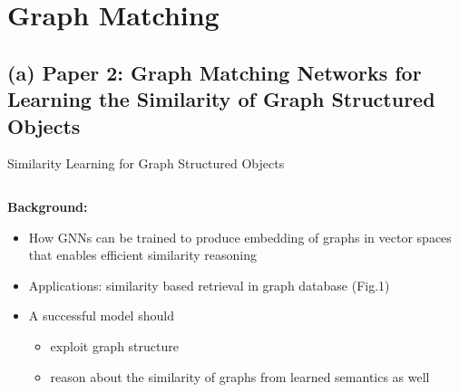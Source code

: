 \documentclass{beamer}
\begin{document}
\section{Graph Matching}


\subsection{(a) Paper 2: Graph Matching Networks for Learning the Similarity of Graph Structured Objects \cite{DBLP:conf/icml/LiGDVK19}}


\begin{frame}{Similarity Learning for Graph Structured Objects}
\begin{columns}
\begin{column}{0.5\linewidth}
\textbf{Background:}
    \begin{itemize}
        \item How GNNs can be trained to produce embedding of graphs in vector spaces that enables efficient similarity reasoning
        \item Applications: similarity based retrieval in graph database (Fig.1)
        \item A successful model should
        \begin{itemize}
            \item exploit graph structure
            \item reason about the similarity of graphs from learned semantics as well
        \end{itemize}
    \end{itemize}
\end{column}


\end{columns}
\end{frame}
\end{document}
